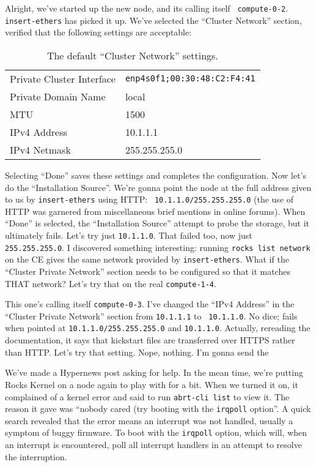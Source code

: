 \documentclass[12pt]{article}
\begin{document}
\qq Alright, we've started up the new node, and its calling itself {\tt
  compute-0-2}. {\tt insert-ethers} has picked it up. We've selected the
``Cluster Network'' section, verified that the following settings are
acceptable:

\begin{table}[H]
  \caption{The default ``Cluster Network'' settings.}
  \begin{center}
    \begin{tabular}{|l|l|}
      \hline
      Private Cluster Interface & {\tt enp4s0f1;00:30:48:C2:F4:41} \\
      Private Domain Name & local \\
      MTU & 1500 \\
      IPv4 Address & 10.1.1.1 \\
      IPv4 Netmask & 255.255.255.0 \\
      \hline
    \end{tabular}
  \end{center}
\end{table}

Selecting ``Done'' saves these settings and completes the configuration. Now
let's do the ``Installation Source''. We're gonna point the node at the full
address given to us by {\tt insert-ethers} using HTTP: {\tt
  10.1.1.0/255.255.255.0} (the use of HTTP was garnered from miscellaneous
brief mentions in online forums). When ``Done'' is selected, the ``Installation
Source'' attempt to probe the storage, but it ultimately fails. Let's try just
{\tt 10.1.1.0}. That failed too, now just {\tt 255.255.255.0}. I discovered
something interesting: running {\tt rocks list network} on the CE gives the same
network provided by {\tt insert-ethers}. What if the ``Cluster Private Network''
section needs to be configured so that it matches THAT network? Let's try that
on the real {\tt compute-1-4}.

\qq This one's calling itself {\tt compute-0-3}. I've changed the ``IPv4
Address'' in the ``Cluster Private Network'' section from {\tt 10.1.1.1} to {\tt
  10.1.1.0}. No dice; fails when pointed at {\tt 10.1.1.0/255.255.255.0} and
{\tt 10.1.1.0}. Actually, rereading the documentation, it says that kickstart
files are transferred over HTTPS rather than HTTP. Let's try that setting. Nope,
nothing. I'm gonna send the

\qq We've made a Hypernews post asking for help. In the mean time, we're putting
Rocks Kernel on a node again to play with for a bit. When we turned it on, it
complained of a kernel error and said to run {\tt abrt-cli list} to view it. The
reason it gave was ``nobody cared (try booting with the {\tt irqpoll}
option''. A quick search revealed that the error means an interrupt was not
handled, usually a symptom of buggy firmware. To boot with the {\tt irqpoll}
option, which will, when an interrupt is encountered, poll all interrupt
handlers in an attempt to resolve the interruption.
\end{document}
